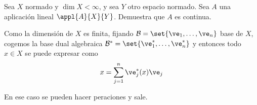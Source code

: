 \begin{problem}[5] Sea $X$ normado y $\dim X < ∞$, y sea $Y$ otro espacio normado. Sea $A$ una aplicación lineal $\appl{A}{X}{Y}$. Demuestra que $A$ es continua.

\solution

Como la dimensión de $X$ es finita, fijando $\mathcal{B} = \set{\ve_1, \dotsc, \ve_n}$ base de $X$, cogemos la base dual algebraica $\mathcal{B}^* = \set{\ve_1^*, \dotsc, \ve_n^*}$ y entonces todo $x ∈X$ se puede expresar como \[ x = \sum_{j = 1}^n \ve_j^*(x) \ve_j \]

En ese caso se pueden hacer peraciones y sale.

\end{problem}
